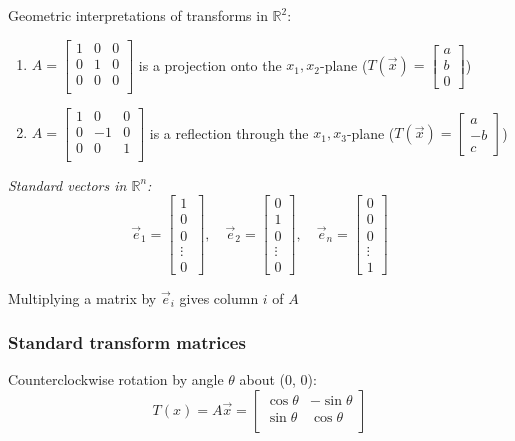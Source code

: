 \documentclass[12pt]{article} %
\newcommand{\R}{\mathbb{R}}
\begin{document}
Geometric interpretations of transforms in $\R^2$:
\begin{enumerate}
	\item $A = \begin{bmatrix}
		1&0&0\\
		0&1&0\\
		0&0&0\\
		\end{bmatrix}$ is a projection onto the $x_1, x_2$-plane ($T(\vec{x}) = \begin{bmatrix}
		a\\b\\0
		\end{bmatrix}$)
	\item $A = \begin{bmatrix}
			1&0&0\\
			0&-1&0\\
			0&0&1\\
		\end{bmatrix}$ is a reflection through the $x_1, x_3$-plane ($T(\vec{x}) = \begin{bmatrix}
		a\\-b\\c
		\end{bmatrix}$)
\end{enumerate}

\emph{Standard vectors in $\R^n$:}
$$\vec{e}_1 = \begin{bmatrix}
	1\\0\\0\\\vdots\\0\
\end{bmatrix}, \quad \vec{e}_2 = \begin{bmatrix}
	0\\1\\0\\\vdots\\0
\end{bmatrix}, \quad \vec{e}_n = \begin{bmatrix}
	0\\0\\0\\\vdots\\1
\end{bmatrix}$$

Multiplying a matrix by $\vec{e}_i$ gives column $i$ of $A$

\subsubsection{Standard transform matrices}
Counterclockwise rotation by angle $\theta$ about (0, 0):
$$T(x) = A\vec{x} = \begin{bmatrix}
	\cos \theta & -\sin \theta\\
	\sin \theta & \cos \theta\\
\end{bmatrix}$$
\end{document}
